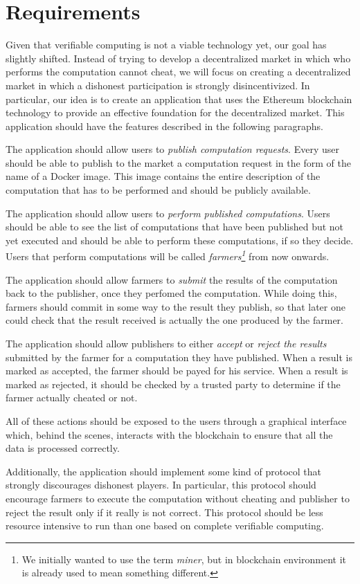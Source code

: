 
\section{Requirements}
\label{sect:requirements}

Given that verifiable computing is not a viable technology yet, our goal has slightly shifted. Instead of trying to develop a decentralized market in which who performs the computation cannot cheat, we will focus on creating a decentralized market in which a dishonest participation is strongly disincentivized. In particular, our idea is to create an application that uses the Ethereum blockchain technology to provide an effective foundation for the decentralized market. This application should have the features described in the following paragraphs.

The application should allow users to \emph{publish computation requests}. Every user should be able to publish to the market a computation request in the form of the name of a Docker image. This image contains the entire description of the computation that has to be performed and should be publicly available.

The application should allow users to \emph{perform published computations}. Users should be able to see the list of computations that have been published but not yet executed and should be able to perform these computations, if so they decide. Users that perform computations will be called \emph{farmers\footnote{We initially wanted to use the term \emph{miner}, but in blockchain environment it is already used to mean something different.}} from now onwards.

The application should allow farmers to \emph{submit} the results of the computation back to the publisher, once they perfomed the computation. While doing this, farmers should commit in some way to the result they publish, so that later one could check that the result received is actually the one produced by the farmer.

The application should allow publishers to either \emph{accept} or \emph{reject the results} submitted by the farmer for a computation they have published. When a result is marked as accepted, the farmer should be payed for his service. When a result is marked as rejected, it should be checked by a trusted party to determine if the farmer actually cheated or not.

All of these actions should be exposed to the users through a graphical interface which, behind the scenes, interacts with the blockchain to ensure that all the data is processed correctly.

Additionally, the application should implement some kind of protocol that strongly discourages dishonest players. In particular, this protocol should encourage farmers to execute the computation without cheating and publisher to reject the result only if it really is not correct. This protocol should be less resource intensive to run than one based on complete verifiable computing.
